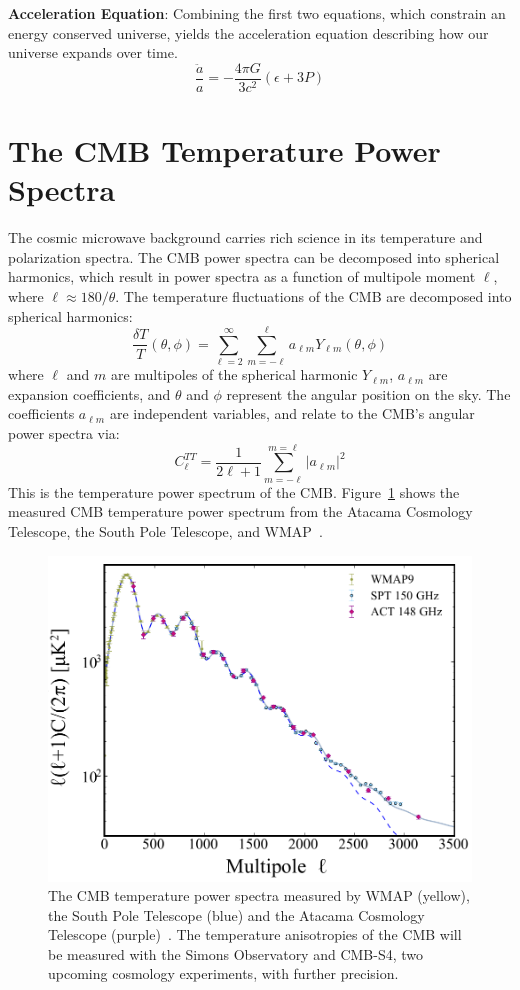 \noindent
\textbf{Acceleration Equation}: Combining the first two equations, which constrain an energy conserved universe, yields the acceleration equation describing how our universe expands over time.  
\begin{equation}
    \frac{\ddot{a}}{a} = - \frac{4\pi G}{3 c^2} (\epsilon + 3 P)
\end{equation}
\section{The CMB Temperature Power Spectra}
The cosmic microwave background carries rich science in its temperature and polarization spectra.  The CMB power spectra can be decomposed into spherical harmonics, which result in power spectra as a function of multipole moment $\ell$, where $\ell\approx180/\theta$.  The temperature fluctuations of the CMB are decomposed into spherical harmonics:
\begin{equation}
\frac{\delta T}{T}(\theta,\phi) = \sum_{\ell=2}^{\infty} \sum_{m=-\ell}^{\ell} a_{\ell m} Y_{\ell m}(\theta,\phi)
    \label{eq:cmb_temp}
\end{equation}
where $\ell$ and $m$ are multipoles of the spherical harmonic $Y_{\ell m}$, $a_{\ell m}$ are expansion coefficients, and $\theta$ and $\phi$ represent the angular position on the sky.  The coefficients $a_{\ell m}$ are independent variables, and relate to the CMB's angular power spectra via:
\begin{equation}
    C_\ell^{TT} = \frac{1}{2\ell +1} \sum_{m=-\ell}^{m=\ell} |a_{\ell m}|^2
\end{equation}
This is the temperature power spectrum of the CMB.  Figure~\ref{fig:measured_cmb_spec} shows the measured CMB temperature power spectrum from the Atacama Cosmology Telescope, the South Pole Telescope, and WMAP~\cite{Das_2014}.
\begin{figure}[t]
    \centering
    \includegraphics[width = .75\textwidth]{Figures/temp_power_spectrum.pdf}
    \caption{The CMB temperature power spectra measured by WMAP (yellow), the South Pole Telescope (blue) and the Atacama Cosmology Telescope (purple)~\cite{Das_2014}.  The temperature anisotropies of the CMB will be measured with the Simons Observatory and CMB-S4, two upcoming cosmology experiments, with further precision.}
    \label{fig:measured_cmb_spec}
\end{figure}
